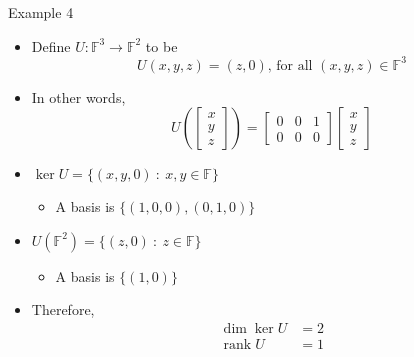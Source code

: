 \documentclass[usenames,dvipsnames,10pt]{beamer}
\newcommand\F{\mathbb{F}}
\newcommand\rank{\operatorname{rank}}
\begin{document}
\begin{frame}
  {Example 4}
  \begin{itemize}
  \item Define $U: \F^3 \rightarrow \F^2$ to be
    \[
      U(x,y,z) = (z,0)\text{, for all }(x,y,z) \in \F^3
    \]
  \item In other words,
    \[
      U\left(\begin{bmatrix} x \\ y \\ z\end{bmatrix}\right)
      =
      \begin{bmatrix} 0 & 0 & 1\\ 0 & 0 & 0 \end{bmatrix}\begin{bmatrix} x \\ y \\ z\end{bmatrix}
    \]
  \item $\ker U = \{ (x,y,0)\ :\ x,y\in \F\}$
    \begin{itemize}
    \item A basis is $\{ (1,0,0), (0,1,0)\}$
    \end{itemize}
  \item $U(\F^2) = \{ (z,0)\ :\ z \in \F \}$
    \begin{itemize}
    \item A basis is $\{ (1,0)\}$
    \end{itemize}
  \item Therefore,
    \begin{align*}
      \dim \ker U &= 2\\
      \rank U &= 1
    \end{align*}
  \end{itemize}
\end{frame}
\end{document}
